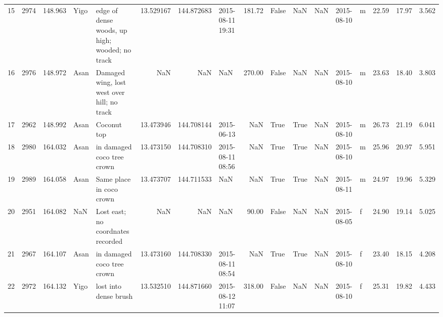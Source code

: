 \begin{tabular}{lrrllrrlrlllllrrr}
15 &       2974 &    148.963 &     Yigo &                                         edge of dense woods, up high; wooded; no track &  13.529167 &  144.872683 &     2015-08-11 19:31 &                  181.72 &             False &     NaN &           NaN &       2015-08-10 &   m &   22.59 &  17.97 &   3.562 \\
16 &       2976 &    148.972 &     Asan &                                            Damaged wing, lost west over hill; no track &        NaN &         NaN &                  NaN &                  270.00 &             False &     NaN &           NaN &       2015-08-10 &   m &   23.63 &  18.40 &   3.803 \\
17 &       2962 &    148.992 &     Asan &                                                                            Coconut top &  13.473946 &  144.708144 &           2015-06-13 &                     NaN &              True &    True &           NaN &       2015-08-10 &   m &   26.73 &  21.19 &   6.041 \\
18 &       2980 &    164.032 &     Asan &                                                             in damaged coco tree crown &  13.473150 &  144.708310 &     2015-08-11 08:56 &                     NaN &              True &    True &           NaN &       2015-08-10 &   m &   25.96 &  20.97 &   5.951 \\
19 &       2989 &    164.058 &     Asan &                                                               Same place in coco crown &  13.473707 &  144.711533 &                  NaN &                     NaN &              True &    True &           NaN &       2015-08-11 &   m &   24.97 &  19.96 &   5.329 \\
20 &       2951 &    164.082 &      NaN &                                                      Lost east; no coordnates recorded &        NaN &         NaN &                  NaN &                   90.00 &             False &     NaN &           NaN &       2015-08-05 &   f &   24.90 &  19.14 &   5.025 \\
21 &       2967 &    164.107 &     Asan &                                                             in damaged coco tree crown &  13.473160 &  144.708330 &     2015-08-11 08:54 &                     NaN &              True &    True &           NaN &       2015-08-10 &   f &   23.40 &  18.15 &   4.208 \\
22 &       2972 &    164.132 &     Yigo &                                                                  lost into dense brush &  13.532510 &  144.871660 &     2015-08-12 11:07 &                  318.00 &             False &     NaN &           NaN &       2015-08-10 &   f &   25.31 &  19.82 &   4.433 \\

\end{tabular}
